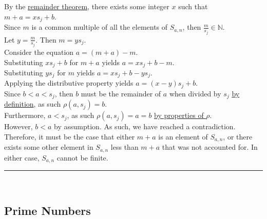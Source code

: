 \documentclass[a4paper,12pt]{article}
\begin{document}
\noindent By the \hyperlink{theorem:remainder_theorem}{remainder theorem}, there exists some integer $x$ such that\\ $m + a = xs_j + b$.\\

\noindent Since $m$ is a common multiple of all the elements of $S_{a,n}$, then $\frac{m}{s_j} \in \mathbb{N}$.\\

\noindent Let $y = \frac{m}{s_j}$. Then $m = ys_j$.\\

\noindent Consider the equation $a = (m + a) - m$.\\

\noindent Substituting $xs_j + b$ for $m + a$ yields $a = xs_j + b - m$.\\

\noindent Substituting $ys_j$ for $m$ yields $a = xs_j + b - ys_j$.\\

\noindent Applying the distributive property yields $a = (x - y)s_j + b$.\\

\noindent Since $b < a < s_j$, then $b$ must be the remainder of $a$ when divided by $s_j$ \hyperlink{theorem:remainder_theorem}{by definition}, as such $\rho(a, s_j) = b$.\\

\noindent Furthermore, $a < s_j$, as such $\rho(a, s_j) = a = b$ \hyperlink{remainder_properties}{by properties of $\rho$}.\\

\noindent However, $b < a$ by assumption. As such, we have reached a contradiction.\\

\noindent Therefore, it must be the case that either $m + a$ is an element of $S_{a,n}$, or there exists some other element in $S_{a,n}$ less than $m + a$ that was not accounted for. In either case, $S_{a,n}$ cannot be finite.


\begin{center}
\noindent\rule{8cm}{0.4pt}
\end{center}
\noindent \\






\subsection{Prime Numbers}
\end{document}
